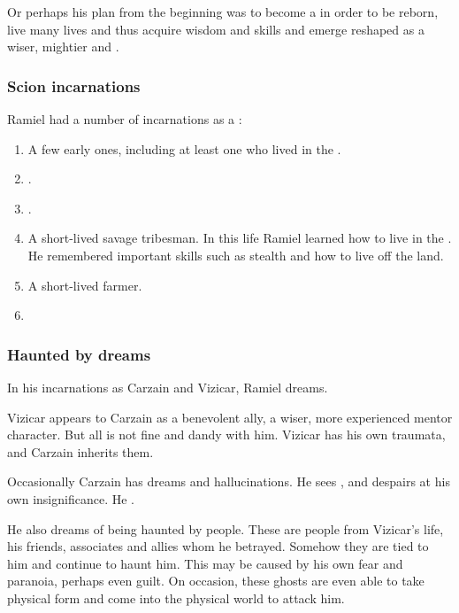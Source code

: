 Or perhaps his plan from the beginning was to become a \malach{} in order to be reborn, live many lives and thus acquire wisdom and skills and emerge reshaped as a wiser, mightier \resphan{} and \vertex. 





\subsubsection{Scion incarnations}
Ramiel had a number of incarnations as a \malach: 

\begin{enumerate}
  \item 
    A few early ones, including at least one who lived in the \VaimonCaliphate. 
  \item 
    .
  \item 
    .
  \item 
    A short-lived savage tribesman.
    In this life Ramiel learned how to live in the \wylde. 
    He remembered important skills such as stealth and how to live off the land.
  \item 
    A short-lived farmer. 
  \item 
\end{enumerate}






\subsubsection{Haunted by dreams}
In his incarnations as Carzain and Vizicar, Ramiel dreams. 

Vizicar appears to Carzain as a benevolent ally, a wiser, more experienced mentor character. But all is not fine and dandy with him. Vizicar has his own traumata, and Carzain inherits them. 

Occasionally Carzain has dreams and hallucinations. 
He sees , and despairs at his own insignificance. 
He .

He also dreams of being haunted by people. 
These are people from Vizicar's life, his friends, associates and allies whom he betrayed. Somehow they are tied to him and continue to haunt him. This may be caused by his own fear and paranoia, perhaps even guilt.
On occasion, these ghosts are even able to take physical form and come into the physical world to attack him. 

